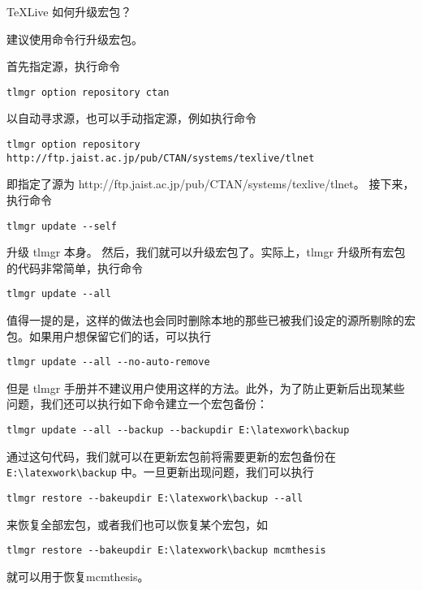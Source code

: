 \begin{faq}{TeXLive 如何升级宏包？}

建议使用命令行升级宏包。

首先指定源，执行命令

\begin{verbatim}
tlmgr option repository ctan
\end{verbatim}

以自动寻求源，也可以手动指定源，例如执行命令

\begin{verbatim}
tlmgr option repository http://ftp.jaist.ac.jp/pub/CTAN/systems/texlive/tlnet
\end{verbatim}

即指定了源为 http://ftp.jaist.ac.jp/pub/CTAN/systems/texlive/tlnet。
接下来，执行命令

\begin{verbatim}
tlmgr update --self
\end{verbatim}

升级 tlmgr 本身。 然后，我们就可以升级宏包了。实际上，tlmgr
升级所有宏包的代码非常简单，执行命令

\begin{verbatim}
tlmgr update --all
\end{verbatim}

值得一提的是，这样的做法也会同时删除本地的那些已被我们设定的源所剔除的宏包。如果用户想保留它们的话，可以执行

\begin{verbatim}
tlmgr update --all --no-auto-remove
\end{verbatim}

但是 tlmgr
手册并不建议用户使用这样的方法。此外，为了防止更新后出现某些问题，我们还可以执行如下命令建立一个宏包备份：

\begin{verbatim}
tlmgr update --all --backup --backupdir E:\latexwork\backup
\end{verbatim}

通过这句代码，我们就可以在更新宏包前将需要更新的宏包备份在
\verb|E:\latexwork\backup| 中。一旦更新出现问题，我们可以执行

\begin{verbatim}
tlmgr restore --bakeupdir E:\latexwork\backup --all
\end{verbatim}

来恢复全部宏包，或者我们也可以恢复某个宏包，如

\begin{verbatim}
tlmgr restore --bakeupdir E:\latexwork\backup mcmthesis
\end{verbatim}

就可以用于恢复mcmthesis。
\end{faq}



